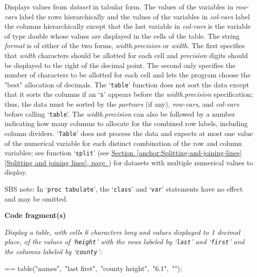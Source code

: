 \documentclass{book}
\makeatletter
\newcommand\Texinfocommandstyletextvar[1]{{\normalfont{}\textsl{#1}}}%
\newenvironment{Texinfopreformatted}{%
  \par\GNUTobeylines\obeyspaces\frenchspacing\parskip=\z@\parindent=\z@}{}
{\catcode`\^^M=13 \gdef\GNUTobeylines{\catcode`\^^M=13 \def^^M{\null\par}}}
\newenvironment{Texinfoindented}{\begin{list}{}{}\item\relax}{\end{list}}
\renewcommand{\_}{\Texinfounderscore\discretionary{}{}{}}
\makeatother
\begin{document}
Displays values from \Texinfocommandstyletextvar{dataset} in tabular form.
The values of the variables in \Texinfocommandstyletextvar{row-vars} label the rows hierarchically and
the values of the variables in \Texinfocommandstyletextvar{col-vars} label the columns hierarchically
except that the last variable in \Texinfocommandstyletextvar{col-vars} is the variable of type double
whose values are displayed in the cells of the table.
The string \Texinfocommandstyletextvar{format} is of either of the two forms,
\Texinfocommandstyletextvar{width}.\Texinfocommandstyletextvar{precision} or \Texinfocommandstyletextvar{width}.
The first specifies that \Texinfocommandstyletextvar{width} characters
should be allotted for each cell and \Texinfocommandstyletextvar{precision} digits should be displayed to the right
of the decimal point.
The second only specifies the number of characters to be allotted for each cell
and lets the program choose the "best" allocation of decimals.
The `\texttt{table}' function does not sort the data except that it sorts the columns if an
`\texttt{s}' appears before the \Texinfocommandstyletextvar{width}.\Texinfocommandstyletextvar{precision} specification; thus, the data must be sorted by
the \Texinfocommandstyletextvar{partvars} (if any), \Texinfocommandstyletextvar{row-vars}, and \Texinfocommandstyletextvar{col-vars} before calling `\texttt{table}'.
The \Texinfocommandstyletextvar{width}.\Texinfocommandstyletextvar{precision} can also be followed by
a number indicating how many columns to allocate for the combined
row labels, including column dividers.
`\texttt{Table}' does not process the data and expects at most one value of the
numerical variable for each distinct combination
of the row and column variables; see function `\texttt{split}'
(see \hyperref[anchor:Splitting-and-joining-lines]{Section~\ref*{anchor:Splitting-and-joining-lines} [Splitting and joining lines], page~\pageref*{anchor:Splitting-and-joining-lines}}) for datasets with multiple numerical
values to display.

SBS note: In `\texttt{proc tabulate}', the `\texttt{class}' and `\texttt{var}' statements have no effect and may be omitted.

\noindent{}\textbf{Code fragment(s)}

\emph{Display a table, with cells 6 characters long and values displayed
to 1 decimal place,
of the values of `\texttt{height}' with the rows
labeled by `\texttt{last}' and `\texttt{first}' and the columns labeled by
`\texttt{county}':}
\begin{Texinfoindented}
\begin{Texinfopreformatted}%
\ttfamily table("names",\ "last first",\ "county height",\ "6.1",\ "");
\end{Texinfopreformatted}
\end{Texinfoindented}
\end{document}
